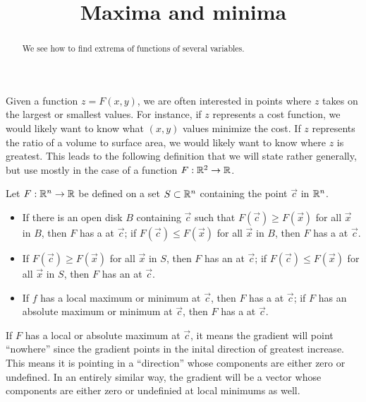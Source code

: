 \documentclass{ximera}
\title[Dig-In:]{Maxima and minima}
\begin{document}
\begin{abstract}
  We see how to find extrema of functions of several variables.
\end{abstract}
\maketitle

Given a function $z=F(x,y)$, we are often interested in points where
$z$ takes on the largest or smallest values. For instance, if $z$
represents a cost function, we would likely want to know what $(x,y)$
values minimize the cost. If $z$ represents the ratio of a volume to
surface area, we would likely want to know where $z$ is greatest. This
leads to the following definition that we will state rather generally,
but use mostly in the case of a function $F:\mathbb R^2\to\mathbb R$.

\begin{definition}
Let $F:\mathbb R^n\to\mathbb R$ be defined on a set $S\subset\mathbb R^n$ containing the
point $\vec{c}$ in $\mathbb R^n$.
\begin{itemize}
\item If there is an open disk $B$ containing $\vec{c}$ such that
  $F(\vec{c}) \geq F(\vec{x})$ for all $\vec{x}$ in $B$, then $F$ has a
   at $\vec{c}$; if $F(\vec{c}) \leq F(\vec{x})$ for all
  $\vec{x}$ in $B$, then $F$ has a  at $\vec{c}$.
\item If $F(\vec{c})\geq F(\vec{x})$ for all $\vec{x}$ in $S$, then $F$ has
  an  at $\vec{c}$; if $F(\vec{c})\leq F(\vec{x})$ for
  all $\vec{x}$ in $S$, then $F$ has an  at
  $\vec{c}$.
\item If $f$ has a local maximum or minimum at $\vec{c}$, then $F$ has a
   at $\vec{c}$; if $F$ has an absolute maximum or
  minimum at $\vec{c}$, then $F$ has a  at $\vec{c}$.
\end{itemize}
\end{definition}

If $F$ has a local or absolute maximum at $\vec{c}$, it means the
gradient will point ``nowhere'' since the gradient points in the
inital direction of greatest increase. This means it is pointing in
a ``direction'' whose components are either zero or undefined. In an
entirely similar way, the gradient will be a vector whose components
are either zero or undefinied at local minimums as well.
\end{document}
